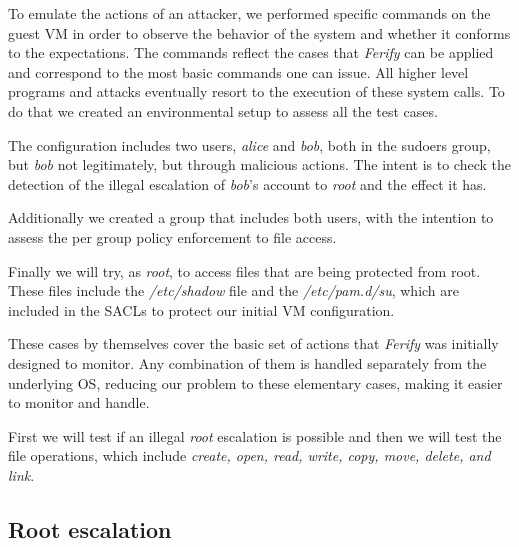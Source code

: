 \par To emulate the actions of an attacker, we performed specific commands on the guest \ac{VM} in order to observe the behavior of the system and whether it conforms to the expectations. The commands reflect the cases that \emph{Ferify} can be applied and correspond to the most basic commands one can issue. All higher level programs and attacks eventually resort to the execution of these system calls. To do that we created an environmental setup to assess all the test cases. 

\par The configuration includes two users, \emph{alice} and \emph{bob}, both in the sudoers group, but \emph{bob} not legitimately, but through malicious actions. The intent is to check the detection of the illegal escalation of \emph{bob}'s account to \emph{root} and the effect it has.

\par Additionally we created a group that includes both users, with the intention to assess the per group policy enforcement to file access. 

\par Finally we will try, as \emph{root}, to access files that are being protected from root. These files include the \emph{/etc/shadow} file and the \emph{/etc/pam.d/su}, which are included in the \acp{SACL} to protect our initial \ac{VM} configuration.

\par These cases by themselves cover the basic set of actions that \emph{Ferify} was initially designed to monitor. Any combination of them is handled separately from the underlying \ac{OS}, reducing our problem to these elementary cases, making it easier to monitor and handle.

\par First we will test if an illegal \emph{root} escalation is possible and then we will test the file operations, which include \emph{create, open, read, write, copy, move, delete, and link}.

\subsection{Root escalation}


